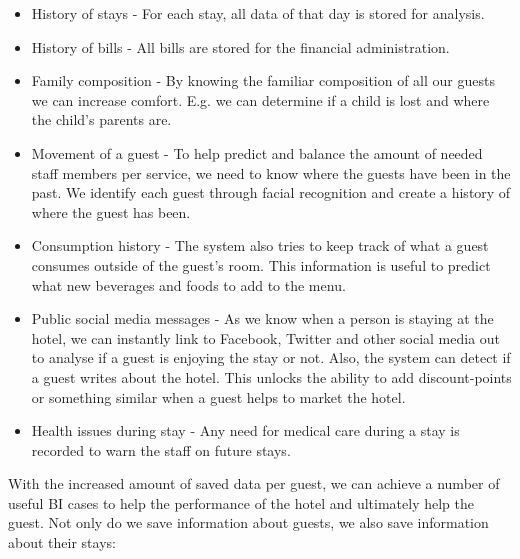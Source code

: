 \begin{itemize}
	\item History of stays - For each stay, all data of that day is stored for analysis.
	\item History of bills - All bills are stored for the financial administration.
	\item Family composition - By knowing the familiar composition of all our guests we can increase comfort. E.g. we can determine if a child is lost and where the child's parents are.
	\item Movement of a guest - To help predict and balance the amount of needed staff members per service, we need to know where the guests have been in the past. We identify each guest through facial recognition and create a history of where the guest has been.
	\item Consumption history - The system also tries to keep track of what a guest consumes outside of the guest's room. This information is useful to predict what new beverages and foods to add to the menu.
	\item Public social media messages - As we know when a person is staying at the hotel, we can instantly link to Facebook, Twitter and other social media out to analyse if a guest is enjoying the stay or not. Also, the system can detect if a guest writes about the hotel. This unlocks the ability to add discount-points or something similar when a guest helps to market the hotel.
	\item Health issues during stay - Any need for medical care during a stay is recorded to warn the staff on future stays.
\end{itemize}

With the increased amount of saved data per guest, we can achieve a number of useful BI cases to help the performance of the hotel and ultimately help the guest. Not only do we save information about guests, we also save information about their stays:

